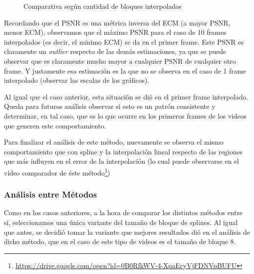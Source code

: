 \begin{figure}[H]
    \centering
    \caption{Comparativa seg\'un cantidad de bloques interpolados}
    \label{fig:movil-movil_vecino-psnr}
\end{figure}

\par Recordando que el PSNR es una m\'etrica inversa del ECM (a mayor PSNR,
menor ECM), observamos que el m\'aximo PSNR para el caso de 10 frames
interpolados (es decir, el m\'inimo ECM) se da en el primer frame. Este PSNR es
claramente un \emph{outlier} respecto de las dem\'as estimaciones, ya que se
puede observar que es claramente mucho mayor a cualquier PSNR de cualquier otro
frame. Y justamente esa estimaci\'on es la que no se observa en el caso de 1
frame interpolado (observar las escalas de los gr\'aficos).

\par Al igual que el caso anterior, esta situaci\'on se di\'o en el primer frame
interpolado. Queda para futuros an\'alisis observar si esto es un patr\'on
consistente y determinar, en tal caso, que es lo que ocurre en los
primeros frames de los videos que generen este comportamiento.

\par Para finalizar el an\'alisis de este m\'etodo, nuevamente se observa el
mismo comportamiento que con spline y la interpolaci\'on lineal respecto de las
regiones que m\'as influyen en el error de la interpolaci\'on (lo cual puede
observarse en el video comparador de \'este
m\'etodo\footnote{\url{https://drive.google.com/open?id=0B0RfkWV-4-XqaEcyVjFDNVpBUFU}})

\subsubsection{An\'alisis entre M\'etodos}
\par Como en los casos anteriores, a la hora de comparar los distintos
m\'etodos entre s\'i, seleccionamos una \'unica variante del tama\~no de bloque
de splines. Al igual que antes, se decidi\'o tomar la variante que mejores
resultados di\'o en el an\'alisis de dicho m\'etodo, que en el caso de este
tipo de videos es el tama\~no de bloque 8.

